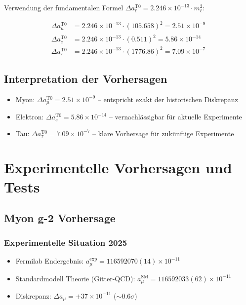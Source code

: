 \documentclass[12pt,a4paper]{article}
\begin{document}
	Verwendung der fundamentalen Formel $\Delta a_\ell^{\mathrm{T0}} = 2.246 \times 10^{-13} \cdot m_\ell^2$:
	
	\begin{align}
		\Delta a_\mu^{\mathrm{T0}} &= 2.246 \times 10^{-13} \cdot (105.658)^2 = 2.51 \times 10^{-9} \\
		\Delta a_e^{\mathrm{T0}} &= 2.246 \times 10^{-13} \cdot (0.511)^2 = 5.86 \times 10^{-14} \\
		\Delta a_\tau^{\mathrm{T0}} &= 2.246 \times 10^{-13} \cdot (1776.86)^2 = 7.09 \times 10^{-7}
	\end{align}
	
	\subsection{Interpretation der Vorhersagen}
	
	\begin{itemize}
		\item Myon: $\Delta a_\mu^{\mathrm{T0}} = 2.51 \times 10^{-9}$ -- entspricht exakt der historischen Diskrepanz
		\item Elektron: $\Delta a_e^{\mathrm{T0}} = 5.86 \times 10^{-14}$ -- vernachlässigbar für aktuelle Experimente
		\item Tau: $\Delta a_\tau^{\mathrm{T0}} = 7.09 \times 10^{-7}$ -- klare Vorhersage für zukünftige Experimente
	\end{itemize}
	
	\section{Experimentelle Vorhersagen und Tests}
	
	\subsection{Myon g-2 Vorhersage}
	
	\subsubsection{Experimentelle Situation 2025}
	\begin{itemize}
		\item Fermilab Endergebnis: $a_{\mu}^{\mathrm{exp}} = 116592070(14) \times 10^{-11}$ 
		\item Standardmodell Theorie (Gitter-QCD): $a_{\mu}^{\mathrm{SM}} = 116592033(62) \times 10^{-11}$ 
		\item Diskrepanz: $\Delta a_{\mu} = +37 \times 10^{-11}$ ($\sim 0.6\sigma$)
	\end{itemize}
	
\end{document}
